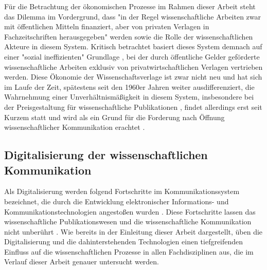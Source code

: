Für die Betrachtung der ökonomischen Prozesse im Rahmen dieser Arbeit steht das Dilemma im Vordergrund, dass "in der Regel wissenschaftliche Arbeiten zwar mit öffentlichen Mitteln finanziert, aber von privaten Verlagen in Fachzeitschriften herausgegeben" \cite[:9]{Cloes_2009} werden sowie die Rolle der wissenschaftlichen Akteure in diesem System. Kritisch betrachtet basiert dieses System demnach auf einer "sozial ineffizienten" Grundlage \cite[:47]{Mueller-Langer_2010}, bei der durch öffentliche Gelder geförderte wissenschaftliche Arbeiten exklusiv von privatwirtschaftlichen Verlagen vertrieben werden. Diese Ökonomie der Wissenschaftsverlage ist zwar nicht neu und hat sich im Laufe der Zeit, spätestens seit den 1960er Jahren weiter ausdifferenziert, die Wahrnehmung einer Unverhältnismäßigkeit in diesem System, insbesondere bei der Preisgestaltung für wissenschaftliche Publikationen \cite{King_2008}, findet allerdings erst seit Kurzem statt \cite{CREATe_2014} und wird als ein Grund für die Forderung nach Öffnung wissenschaftlicher Kommunikation erachtet \cite{Yiotis_2013} \cite{Herb_2010}.

\subsection{Digitalisierung der wissenschaftlichen Kommunikation}

Als Digitalisierung werden folgend Fortschritte im Kommunikationssystem bezeichnet, die durch die Entwicklung elektronischer Informations- und Kommunikationstechnologien angestoßen wurden \cite{BBAW_2015}. Diese Fortschritte lassen das wissenschaftliche Publikationswesen und die wissenschaftliche Kommunikation nicht unberührt \cite{Naeder_2010}. Wie bereits in der Einleitung dieser Arbeit dargestellt, üben die Digitalisierung und die dahinterstehenden Technologien einen tiefgreifenden Einfluss auf die wissenschaftlichen Prozesse in allen Fachdisziplinen aus, die im Verlauf dieser Arbeit genauer untersucht werden.

